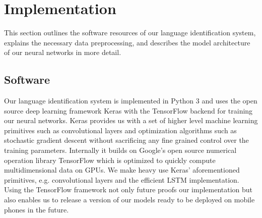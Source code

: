 \section{Implementation}
\label{sec:implementation}
This section outlines the software resources of our language identification system, explains the necessary data preprocessing, and describes the model architecture of our neural networks in more detail.

\subsection{Software}
\label{sec:software}

	Our language identification system is implemented in Python 3 and uses the open source deep learning framework Keras\cite{chollet2015keras} with the TensorFlow\cite{abadi2016tensorflow} backend for training our neural networks. Keras provides us with a set of higher level machine learning primitives such as convolutional layers and optimization algorithms such as stochastic gradient descent without sacrificing any fine grained control over the training parameters. Internally it builds on Google's open source numerical operation library TensorFlow which is optimized to quickly compute multidimensional data on GPUs. We make heavy use Keras' aforementioned primitives, e.g. convolutional layers and the efficient LSTM implementation. Using the TensorFlow framework not only future proofs our implementation but also enables us to release a version of our models ready to be deployed on mobile phones in the future.
	
